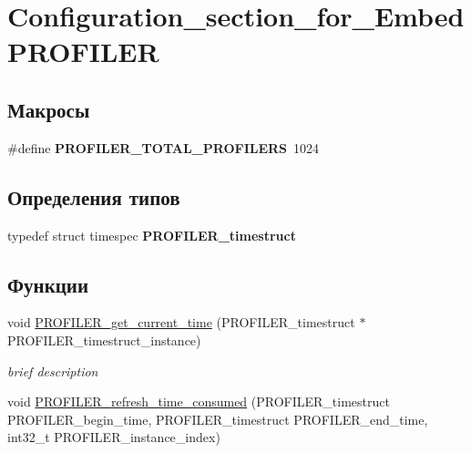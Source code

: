 \hypertarget{group___configuration__section__for___embed_p_r_o_f_i_l_e_r}{\section{\-Configuration\-\_\-section\-\_\-for\-\_\-\-Embed\-P\-R\-O\-F\-I\-L\-E\-R}
\label{group___configuration__section__for___embed_p_r_o_f_i_l_e_r}
}
\subsection*{Макросы}
\begin{DoxyCompactItemize}
\item 
\hypertarget{group___configuration__section__for___embed_p_r_o_f_i_l_e_r_ga775939d541e95ea75e6e7066a1cc6bcb}{\#define {\bfseries \-P\-R\-O\-F\-I\-L\-E\-R\-\_\-\-T\-O\-T\-A\-L\-\_\-\-P\-R\-O\-F\-I\-L\-E\-R\-S}~1024}\label{group___configuration__section__for___embed_p_r_o_f_i_l_e_r_ga775939d541e95ea75e6e7066a1cc6bcb}

\end{DoxyCompactItemize}
\subsection*{Определения типов}
\begin{DoxyCompactItemize}
\item 
\hypertarget{group___configuration__section__for___embed_p_r_o_f_i_l_e_r_gae02193769f3b21a09fc0d5035e566a75}{typedef struct timespec {\bfseries \-P\-R\-O\-F\-I\-L\-E\-R\-\_\-timestruct}}\label{group___configuration__section__for___embed_p_r_o_f_i_l_e_r_gae02193769f3b21a09fc0d5035e566a75}

\end{DoxyCompactItemize}
\subsection*{Функции}
\begin{DoxyCompactItemize}
\item 
void \hyperlink{group___configuration__section__for___embed_p_r_o_f_i_l_e_r_ga106b837099d8b52043148fa42592608b}{\-P\-R\-O\-F\-I\-L\-E\-R\-\_\-get\-\_\-current\-\_\-time} (\-P\-R\-O\-F\-I\-L\-E\-R\-\_\-timestruct $\ast$\-P\-R\-O\-F\-I\-L\-E\-R\-\_\-timestruct\-\_\-instance)
\begin{DoxyCompactList}\small\item\em brief description \end{DoxyCompactList}\item 
void \hyperlink{group___configuration__section__for___embed_p_r_o_f_i_l_e_r_ga0072e0d84e203ad6499be54f4b6e14ee}{\-P\-R\-O\-F\-I\-L\-E\-R\-\_\-refresh\-\_\-time\-\_\-consumed} (\-P\-R\-O\-F\-I\-L\-E\-R\-\_\-timestruct \-P\-R\-O\-F\-I\-L\-E\-R\-\_\-begin\-\_\-time, \-P\-R\-O\-F\-I\-L\-E\-R\-\_\-timestruct \-P\-R\-O\-F\-I\-L\-E\-R\-\_\-end\-\_\-time, int32\-\_\-t \-P\-R\-O\-F\-I\-L\-E\-R\-\_\-instance\-\_\-index)
\end{DoxyCompactItemize}


